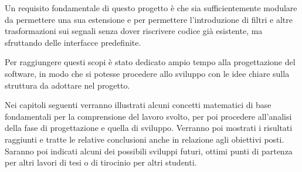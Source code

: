 Un requisito fondamentale di questo progetto \`e che sia sufficientemente
modulare da permettere una sua estensione e per permettere l'introduzione di
filtri e altre trasformazioni sui segnali senza dover riscrivere codice gi\`a
esistente, ma sfruttando delle interfacce predefinite.

Per raggiungere questi scopi \`e stato dedicato ampio tempo alla progettazione
del software, in modo che si potesse procedere allo sviluppo con le idee chiare
sulla struttura da adottare nel progetto.

Nei capitoli seguenti verranno illustrati alcuni concetti matematici di base
fondamentali per la comprensione del lavoro svolto, per poi procedere
all'analisi della fase di progettazione e quella di sviluppo. Verranno poi
mostrati i risultati raggiunti e tratte le relative conclusioni anche in
relazione agli obiettivi posti. Saranno poi indicati alcuni dei possibili
sviluppi futuri, ottimi punti di partenza per altri lavori di tesi o di
tirocinio per altri studenti.
